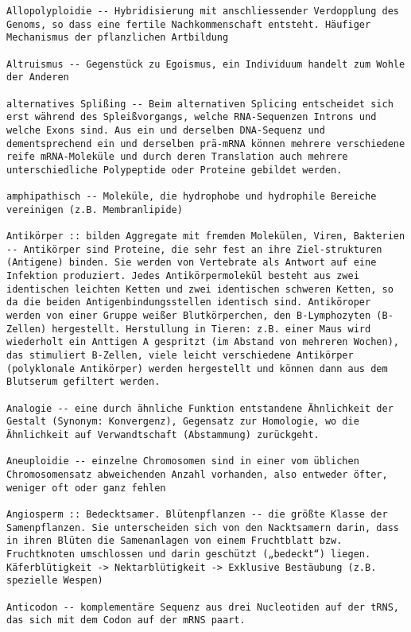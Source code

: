 \documentclass{article}
\begin{document}
\begin{verbatim}
Allopolyploidie -- Hybridisierung mit anschliessender Verdopplung des Genoms, so dass eine fertile Nachkommenschaft entsteht. Häufiger Mechanismus der pflanzlichen Artbildung

Altruismus -- Gegenstück zu Egoismus, ein Individuum handelt zum Wohle der Anderen

alternatives Splißing -- Beim alternativen Splicing entscheidet sich erst während des Spleißvorgangs, welche RNA-Sequenzen Introns und welche Exons sind. Aus ein und derselben DNA-Sequenz und dementsprechend ein und derselben prä-mRNA können mehrere verschiedene reife mRNA-Moleküle und durch deren Translation auch mehrere unterschiedliche Polypeptide oder Proteine gebildet werden.

amphipathisch -- Moleküle, die hydrophobe und hydrophile Bereiche vereinigen (z.B. Membranlipide)

Antikörper :: bilden Aggregate mit fremden Molekülen, Viren, Bakterien -- Antikörper sind Proteine, die sehr fest an ihre Ziel-strukturen (Antigene) binden. Sie werden von Vertebrate als Antwort auf eine Infektion produziert. Jedes Antikörpermolekül besteht aus zwei identischen leichten Ketten und zwei identischen schweren Ketten, so da die beiden Antigenbindungsstellen identisch sind. Antiköroper werden von einer Gruppe weißer Blutkörperchen, den B-Lymphozyten (B-Zellen) hergestellt. Herstullung in Tieren: z.B. einer Maus wird wiederholt ein Anttigen A gespritzt (im Abstand von mehreren Wochen), das stimuliert B-Zellen, viele leicht verschiedene Antikörper (polyklonale Antikörper) werden hergestellt und können dann aus dem Blutserum gefiltert werden.

Analogie -- eine durch ähnliche Funktion entstandene Ähnlichkeit der Gestalt (Synonym: Konvergenz), Gegensatz zur Homologie, wo die Ähnlichkeit auf Verwandtschaft (Abstammung) zurückgeht.

Aneuploidie -- einzelne Chromosomen sind in einer vom üblichen Chromosomensatz abweichenden Anzahl vorhanden, also entweder öfter, weniger oft oder ganz fehlen

Angiosperm :: Bedecktsamer. Blütenpflanzen -- die größte Klasse der Samenpflanzen. Sie unterscheiden sich von den Nacktsamern darin, dass in ihren Blüten die Samenanlagen von einem Fruchtblatt bzw. Fruchtknoten umschlossen und darin geschützt („bedeckt“) liegen. Käferblütigkeit -> Nektarblütigkeit -> Exklusive Bestäubung (z.B. spezielle Wespen)

Anticodon -- komplementäre Sequenz aus drei Nucleotiden auf der tRNS, das sich mit dem Codon auf der mRNS paart.


\end{verbatim}
\end{document}
